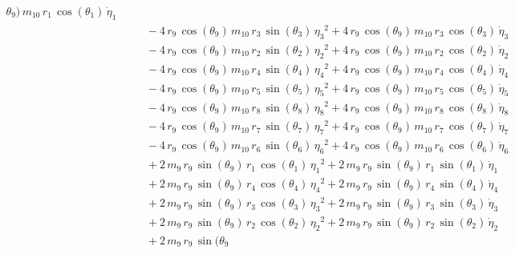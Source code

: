 \begin{eqnarray*}
{\theta_{9}})\,m_{10}\,r_{1}\,\cos({\theta_{1}})\,{\dot{\eta}_{1}}
 \\ &&\quad\mbox{} - 4\,r_{9}\,\cos({\theta_{9}})\,m_{10}\,r_{3}\,\sin
({\theta_{3}})\,{{\eta_{3}}}^2 + 4\,r_{9}\,\cos({\theta_{9}})\,m_{10}
\,r_{3}\,\cos({\theta_{3}})\,{\dot{\eta}_{3}} \\ &&\quad\mbox{} - 4\,r
_{9}\,\cos({\theta_{9}})\,m_{10}\,r_{2}\,\sin({\theta_{2}})\,{{\eta_{2
}}}^2 + 4\,r_{9}\,\cos({\theta_{9}})\,m_{10}\,r_{2}\,\cos({\theta_{2}}
)\,{\dot{\eta}_{2}} \\ &&\quad\mbox{} - 4\,r_{9}\,\cos({\theta_{9}})\,
m_{10}\,r_{4}\,\sin({\theta_{4}})\,{{\eta_{4}}}^2 + 4\,r_{9}\,\cos({
\theta_{9}})\,m_{10}\,r_{4}\,\cos({\theta_{4}})\,{\dot{\eta}_{4}}
 \\ &&\quad\mbox{} - 4\,r_{9}\,\cos({\theta_{9}})\,m_{10}\,r_{5}\,\sin
({\theta_{5}})\,{{\eta_{5}}}^2 + 4\,r_{9}\,\cos({\theta_{9}})\,m_{10}
\,r_{5}\,\cos({\theta_{5}})\,{\dot{\eta}_{5}} \\ &&\quad\mbox{} - 4\,r
_{9}\,\cos({\theta_{9}})\,m_{10}\,r_{8}\,\sin({\theta_{8}})\,{{\eta_{8
}}}^2 + 4\,r_{9}\,\cos({\theta_{9}})\,m_{10}\,r_{8}\,\cos({\theta_{8}}
)\,{\dot{\eta}_{8}} \\ &&\quad\mbox{} - 4\,r_{9}\,\cos({\theta_{9}})\,
m_{10}\,r_{7}\,\sin({\theta_{7}})\,{{\eta_{7}}}^2 + 4\,r_{9}\,\cos({
\theta_{9}})\,m_{10}\,r_{7}\,\cos({\theta_{7}})\,{\dot{\eta}_{7}}
 \\ &&\quad\mbox{} - 4\,r_{9}\,\cos({\theta_{9}})\,m_{10}\,r_{6}\,\sin
({\theta_{6}})\,{{\eta_{6}}}^2 + 4\,r_{9}\,\cos({\theta_{9}})\,m_{10}
\,r_{6}\,\cos({\theta_{6}})\,{\dot{\eta}_{6}} \\ &&\quad\mbox{} + 2\,m
_{9}\,r_{9}\,\sin({\theta_{9}})\,r_{1}\,\cos({\theta_{1}})\,{{\eta_{1}
}}^2 + 2\,m_{9}\,r_{9}\,\sin({\theta_{9}})\,r_{1}\,\sin({\theta_{1}})
\,{\dot{\eta}_{1}} \\ &&\quad\mbox{} + 2\,m_{9}\,r_{9}\,\sin({\theta_{
9}})\,r_{4}\,\cos({\theta_{4}})\,{{\eta_{4}}}^2 + 2\,m_{9}\,r_{9}\,
\sin({\theta_{9}})\,r_{4}\,\sin({\theta_{4}})\,{\dot{\eta}_{4}}
 \\ &&\quad\mbox{} + 2\,m_{9}\,r_{9}\,\sin({\theta_{9}})\,r_{3}\,\cos(
{\theta_{3}})\,{{\eta_{3}}}^2 + 2\,m_{9}\,r_{9}\,\sin({\theta_{9}})\,r
_{3}\,\sin({\theta_{3}})\,{\dot{\eta}_{3}} \\ &&\quad\mbox{} + 2\,m_{9
}\,r_{9}\,\sin({\theta_{9}})\,r_{2}\,\cos({\theta_{2}})\,{{\eta_{2}}}^
2 + 2\,m_{9}\,r_{9}\,\sin({\theta_{9}})\,r_{2}\,\sin({\theta_{2}})\,{
\dot{\eta}_{2}} \\ &&\quad\mbox{} + 2\,m_{9}\,r_{9}\,\sin({\theta_{9}}

\end{eqnarray*}
